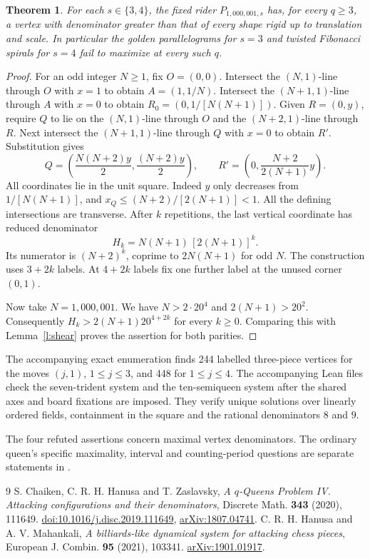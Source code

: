 \documentclass[11pt]{article}
\newtheorem{theorem}{Theorem}
\begin{document}
\begin{theorem}\label{t:uniform}
For each $s\in\{3,4\}$, the fixed rider $P_{1,000,001,s}$ has, for every $q\ge3$, a vertex with denominator greater than that of every shape rigid up to translation and scale. In particular the golden parallelograms for $s=3$ and twisted Fibonacci spirals for $s=4$ fail to maximize at every such $q$.
\end{theorem}
\begin{proof}
For an odd integer $N\ge1$, fix $O=(0,0)$. Intersect the $(N,1)$-line through $O$ with $x=1$ to obtain $A=(1,1/N)$. Intersect the $(N+1,1)$-line through $A$ with $x=0$ to obtain $R_0=(0,1/[N(N+1)])$. Given $R=(0,y)$, require $Q$ to lie on the $(N,1)$-line through $O$ and the $(N+2,1)$-line through $R$. Next intersect the $(N+1,1)$-line through $Q$ with $x=0$ to obtain $R'$. Substitution gives
\[
 Q=\left(\frac{N(N+2)y}{2},\frac{(N+2)y}{2}\right),\qquad
 R'=\left(0,\frac{N+2}{2(N+1)}y\right).
\]
All coordinates lie in the unit square. Indeed $y$ only decreases from $1/[N(N+1)]$, and $x_Q\le(N+2)/[2(N+1)]<1$. All the defining intersections are transverse. After $k$ repetitions, the last vertical coordinate has reduced denominator
\[
     H_k=N(N+1)\,[2(N+1)]^k.
\]
Its numerator is $(N+2)^k$, coprime to $2N(N+1)$ for odd $N$. The construction uses $3+2k$ labels. At $4+2k$ labels fix one further label at the unused corner $(0,1)$.

Now take $N=1,000,001$. We have $N>2\cdot20^4$ and $2(N+1)>20^2$. Consequently $H_k>2(N+1)20^{4+2k}$ for every $k\ge0$. Comparing this with Lemma~\ref{l:shear} proves the assertion for both parities.
\end{proof}

The accompanying exact enumeration finds 244 labelled three-piece vertices for the moves $(j,1)$, $1\le j\le3$, and 448 for $1\le j\le4$. The accompanying Lean files check the seven-trident system and the ten-semiqueen system after the shared axes and board fixations are imposed. They verify unique solutions over linearly ordered fields, containment in the square and the rational denominators $8$ and $9$.

The four refuted assertions concern maximal vertex denominators. The ordinary queen's specific maximality, interval and counting-period questions are separate statements in \cite[\S6]{chz}.

\small
\begin{thebibliography}{9}
 S. Chaiken, C. R. H. Hanusa and T. Zaslavsky, \emph{A $q$-Queens Problem IV. Attacking configurations and their denominators}, Discrete Math. \textbf{343} (2020), 111649. \href{https://doi.org/10.1016/j.disc.2019.111649}{doi:10.1016/j.disc.2019.111649}, \href{https://arxiv.org/abs/1807.04741}{arXiv:1807.04741}.
 C. R. H. Hanusa and A. V. Mahankali, \emph{A billiards-like dynamical system for attacking chess pieces}, European J. Combin. \textbf{95} (2021), 103341. \href{https://arxiv.org/abs/1901.01917}{arXiv:1901.01917}.
\end{thebibliography}
\end{document}
